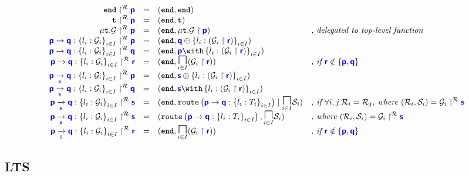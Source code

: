 \documentclass{article}
\begin{document}
\doublespacing
\[
\begin{array}{>{\displaystyle}rc>{\displaystyle}l>{\displaystyle}l}
	\projroute{\tyend}{p} & = & (\tyend, \tyend) & \\
	\projroute{\tyrecvar}{p} & = & (\tyend, \tyrecvar) & \\
	\projroute{\tyrec{\newglobal}}{p} & = & (\tyend, \proj{\tyrec{\newglobal}}{p}) & \textit{, delegated to top-level function} \\
	\projroute{\gcomm{p}{q}{l_i: \newglobal_i}{i \in I}}{p} & = & (\tyend, \tysel{q}{l_i: \left(\proj{\newglobal_i}{r}\right)}{i \in I}) &  \\
	\projroute{\gcomm{p}{q}{l_i: \newglobal_i}{i \in I}}{q} & = & (\tyend, \tybra{p}{l_i: \left(\proj{\newglobal_i}{r}\right)}{i \in I}) & \\
	\projroute{\gcomm{p}{q}{l_i: \newglobal_i}{i \in I}}{r} & = & (\tyend, \underset{i \in I}{\tyMERGEOP}(\proj{\newglobal_i}{r})) & \textit{, if } \role{r} \notin \{\role{p}, \role{q}\} \\
	\projroute{\gcommroute{p}{q}{s}{l_i: \newglobal_i}{i \in I}}{p} & = & (\tyend, \tysel{s}{l_i: \left(\proj{\newglobal_i}{r}\right)}{i \in I}) & \\
	\projroute{\gcommroute{p}{q}{s}{l_i: \newglobal_i}{i \in I}}{q} & = & (\tyend, \tybra{s}{l_i: \left(\proj{\newglobal_i}{r}\right)}{i \in I}) & \\
	\projroute{\gcommroute{p}{q}{s}{l_i: \newglobal_i}{i \in I}}{s} & = & (\tyend, \tyroutepar{\tyroute{p}{q}{l_i: T_i}{i \in I}}{\underset{i \in I}{\tyMERGEOP}\newlocal_i}) & \textit{, if } \forall i, j. \newroute_i = \newroute_j \textit{, where } (\newroute_i, \newlocal_i) = \projroute{\newglobal_i}{s} \\
	\projroute{\gcommroute{p}{q}{s}{l_i: \newglobal_i}{i \in I}}{s} & = & (\tyroute{p}{q}{l_i: T_i}{i \in I}, \underset{i \in I}{\tyMERGEOP}\newlocal_i) & \textit{, where } (\newroute_i, \newlocal_i) = \projroute{\newglobal_i}{s} \\

	\projroute{\gcommroute{p}{q}{s}{l_i: \newglobal_i}{i \in I}}{r} & = & (\tyend, \underset{i \in I}{\tyMERGEOP}(\proj{\newglobal_i}{r})) & \textit{, if } \role{r} \notin \{\role{p}, \role{q}\} \\
\end{array}
\]
\singlespacing

\subsection{LTS}
\end{document}
